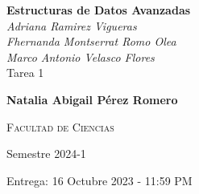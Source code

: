 \begin{titlepage}
    \begin{center}
        \vspace*{1cm}
        
        \Huge
          \textbf{Estructuras de Datos Avanzadas}
        \vspace{0.5cm}
        \small
        \\
        \textit{Adriana Ramirez Vigueras}\\
        \textit{Fhernanda Montserrat Romo Olea}\\
        \textit{Marco Antonio Velasco Flores}\\

        \vspace{0.5cm}
        \LARGE
        Tarea 1
        
        \vspace{1.5cm}
        
        \textbf{Natalia Abigail Pérez Romero} 
   		  \vspace{1.5cm}
        
        \textsc{Facultad de Ciencias} 
       
        \vfill
        
        Semestre 2024-1 
        
        \vspace{0.8cm}
          \Large
        \vspace{0.5cm}
       Entrega: 16 Octubre 2023 - 11:59 PM
        
    \end{center}
\end{titlepage}